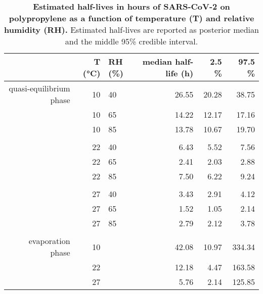 \begin{table}[ht]
\centering
\caption{\textbf{Estimated half-lives in hours of SARS-CoV-2 on polypropylene as a function of temperature (T) and relative humidity (RH).} Estimated half-lives are reported as posterior median and the middle 95\% credible interval.} 
\label{tab:plastic-halflives}
\begingroup\small
\begin{tabular}{rrlrrr}
  \hline
 & T (\si{\celsius}) & RH (\si{\%}) & median half-life (h) & 2.5 \si{\%} & 97.5 \si{\%} \\ 
  \hline
quasi-equilibrium phase & 10 & 40 & 26.55 & 20.28 & 38.75 \\ 
   & 10 & 65 & 14.22 & 12.17 & 17.16 \\ 
   & 10 & 85 & 13.78 & 10.67 & 19.70 \\ 
   \\ 
 & 22 & 40 & 6.43 & 5.52 & 7.56 \\ 
   & 22 & 65 & 2.41 & 2.03 & 2.88 \\ 
   & 22 & 85 & 7.50 & 6.22 & 9.24 \\ 
   \\ 
 & 27 & 40 & 3.43 & 2.91 & 4.12 \\ 
   & 27 & 65 & 1.52 & 1.05 & 2.14 \\ 
   & 27 & 85 & 2.79 & 2.12 & 3.78 \\ 
   \\ 
evaporation phase & 10 &  & 42.08 & 10.97 & 334.34 \\ 
   & 22 &  & 12.18 & 4.47 & 163.58 \\ 
   & 27 &  & 5.76 & 2.14 & 125.85 \\ 
   \hline
\end{tabular}
\endgroup
\end{table}
